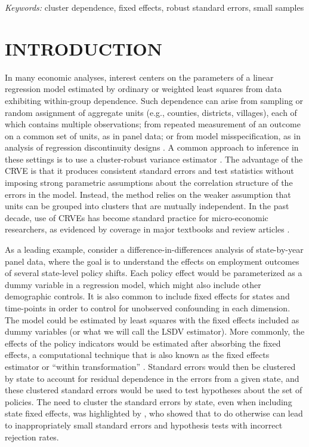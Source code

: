 \documentclass[12pt]{article}
\begin{document}
\noindent%
{\it Keywords:} cluster dependence, fixed effects, robust standard
errors, small samples
\vfill

\newpage
{} %

\hypertarget{sec:intro}{%
\section{INTRODUCTION}\label{sec:intro}}

In many economic analyses, interest centers on the parameters of a
linear regression model estimated by ordinary or weighted least squares
from data exhibiting within-group dependence. Such dependence can arise
from sampling or random assignment of aggregate units (e.g., counties,
districts, villages), each of which contains multiple observations; from
repeated measurement of an outcome on a common set of units, as in panel
data; or from model misspecification, as in analysis of regression
discontinuity designs \citep[e.g.,][]{Lee2008regression}. A common
approach to inference in these settings is to use a cluster-robust
variance estimator
\citep[CRVE,][]{Arellano1987computing, Liang1986longitudinal, white1984asymptotic}.
The advantage of the CRVE is that it produces consistent standard errors
and test statistics without imposing strong parametric assumptions about
the correlation structure of the errors in the model. Instead, the
method relies on the weaker assumption that units can be grouped into
clusters that are mutually independent. In the past decade, use of CRVEs
has become standard practice for micro-economic researchers, as
evidenced by coverage in major textbooks and review articles
\citep[e.g.,][]{Wooldridge2010econometric, Angrist2009mostly, Cameron2015practitioners}.

As a leading example, consider a difference-in-differences analysis of
state-by-year panel data, where the goal is to understand the effects on
employment outcomes of several state-level policy shifts. Each policy
effect would be parameterized as a dummy variable in a regression model,
which might also include other demographic controls. It is also common
to include fixed effects for states and time-points in order to control
for unobserved confounding in each dimension. The model could be
estimated by least squares with the fixed effects included as dummy
variables (or what we will call the LSDV estimator). More commonly, the
effects of the policy indicators would be estimated after absorbing the
fixed effects, a computational technique that is also known as the fixed
effects estimator or ``within transformation''
\citep{Wooldridge2010econometric}. Standard errors would then be
clustered by state to account for residual dependence in the errors from
a given state, and these clustered standard errors would be used to test
hypotheses about the set of policies. The need to cluster the standard
errors by state, even when including state fixed effects, was
highlighted by \citet{Bertrand2004how}, who showed that to do otherwise
can lead to inappropriately small standard errors and hypothesis tests
with incorrect rejection rates.
\end{document}
